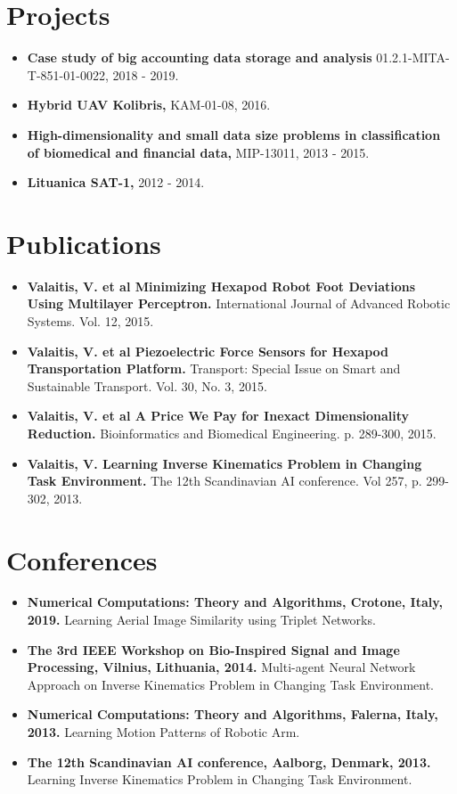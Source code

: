 \documentclass[letterpaper,11pt]{article}
\newcommand{\resumeItem}[2]{
  \item\small{
    \textbf{#1}{ #2 \vspace{-2pt}}
  }
}
\newcommand{\resumeSubItem}[2]{\resumeItem{#1}{#2}\vspace{-4pt}}
\newcommand{\resumeSubHeadingListStart}{\begin{itemize}[leftmargin=*] \renewcommand\labelitemi{$\circ$}}
\newcommand{\resumeSubHeadingListEnd}{\end{itemize}}
\begin{document}
\section{Projects}
  \resumeSubHeadingListStart
    \resumeSubItem{Case study of big accounting data storage and analysis}{01.2.1-MITA-T-851-01-0022, 2018 - 2019.}
    \resumeSubItem{Hybrid UAV Kolibris,}{KAM-01-08, 2016.}
    \resumeSubItem{High-dimensionality and small data size problems in classification of biomedical and financial data,}{MIP-13011, 2013 - 2015.}
    \resumeSubItem{Lituanica SAT-1,}{2012 - 2014.}
  \resumeSubHeadingListEnd

\section{Publications}
    \resumeSubHeadingListStart
    \resumeSubItem{Valaitis, V. et al Minimizing Hexapod Robot Foot Deviations Using Multilayer Perceptron.}{International Journal of Advanced Robotic Systems. Vol. 12, 2015.}
    \resumeSubItem{Valaitis, V. et al Piezoelectric Force Sensors for Hexapod Transportation Platform.}{Transport: Special Issue on Smart and Sustainable Transport. Vol. 30, No. 3, 2015.}
    \resumeSubItem{Valaitis, V. et al A Price We Pay for Inexact Dimensionality Reduction.}{Bioinformatics and Biomedical Engineering. p. 289-300, 2015.}
    \resumeSubItem{Valaitis, V. Learning Inverse Kinematics Problem in Changing Task Environment.}{The 12th Scandinavian AI conference. Vol 257, p. 299-302, 2013.}
  \resumeSubHeadingListEnd

\section{Conferences}
  \resumeSubHeadingListStart
    \resumeSubItem{Numerical Computations: Theory and Algorithms, Crotone, Italy, 2019.}{Learning Aerial Image Similarity using Triplet Networks.}
    \resumeSubItem{The 3rd IEEE Workshop  on Bio-Inspired Signal and Image Processing, Vilnius, Lithuania, 2014.}{Multi-agent Neural Network Approach on Inverse Kinematics Problem in Changing Task Environment.}
    \resumeSubItem{Numerical Computations: Theory and Algorithms, Falerna, Italy, 2013.}{Learning Motion Patterns of Robotic Arm.}
    \resumeSubItem{The 12th Scandinavian AI conference, Aalborg, Denmark, 2013.}{Learning Inverse Kinematics Problem in Changing Task Environment.}
  \resumeSubHeadingListEnd
\end{document}
